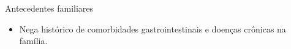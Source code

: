 \begin{frame}{Antecedentes familiares}
    \begin{itemize}
        \item Nega histórico de comorbidades gastrointestinais e doenças crônicas na família.
    \end{itemize}
\end{frame}

